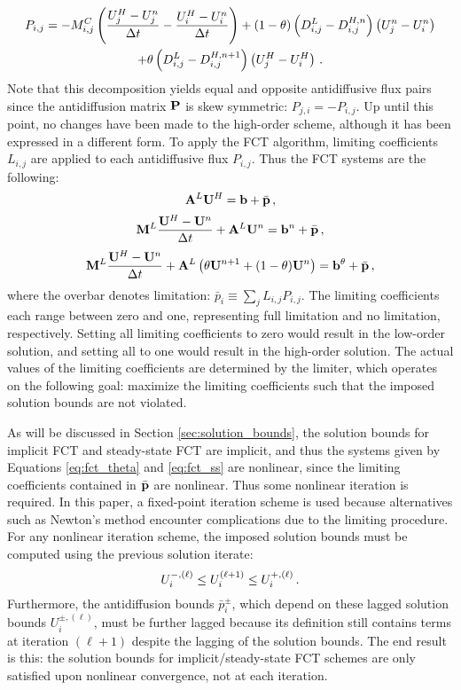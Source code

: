 \begin{multline}
  P_{i,j} = -M^C_{i,j}\pr{\frac{U^H_j - U^n_j}{\dt} - \frac{U^H_i - U^n_i}{\dt}}
    + (1-\theta)\pr{D^L_{i,j} - D^{H,n}_{i,j}}\pr{U^n_j - U^n_i}\\
    + \theta\pr{D^L_{i,j} - D^{H,n+1}_{i,j}}\pr{U^H_j - U^H_i} \eqp
\end{multline}
Note that this decomposition yields equal and opposite antidiffusive flux pairs
since the antidiffusion matrix $\P$ is skew symmetric: $P_{j,i}=-P_{i,j}$.
Up until this point, no changes have been made to the
high-order scheme, although it has been expressed in a different form.
To apply the FCT algorithm, limiting coefficients $L_{i,j}$ are applied to
each antidiffusive flux $P_{i,j}$. Thus the FCT systems are the following:
\begin{equation}\label{eq:fct_ss}
  \A^L \U^H = \ssrhs + \bar{\p} \eqc
\end{equation}
\begin{equation}\label{eq:fct_fe}
  \M^L\frac{\U^H - \U^n}{\dt} + \A^L\U^n = \ssrhs^n + \bar{\p} \eqc
\end{equation}
\begin{equation}\label{eq:fct_theta}
  \M^L\frac{\U^H - \U^n}{\dt} + \A^L\pr{\theta\U^{n+1} + (1-\theta)\U^n}
    = \ssrhs^\theta + \bar{\p} \eqc
\end{equation}
where the overbar denotes limitation: $\bar{p}_i\equiv\sum_j L_{i,j}P_{i,j}$.
The limiting coefficients each range between zero and one, representing
full limitation and no limitation, respectively. Setting all limiting
coefficients to zero would result in the low-order solution, and setting
all to one would result in the high-order solution. The actual values of the
limiting coefficients are determined by the limiter, which operates on the
following goal: maximize the limiting coefficients such that the imposed
solution bounds are not violated.

As will be discussed in Section \ref{sec:solution_bounds}, the solution bounds
for implicit FCT and steady-state FCT are implicit, and thus the systems given
by Equations \eqref{eq:fct_theta} and \eqref{eq:fct_ss} are nonlinear, since
the limiting coefficients contained in $\bar{\p}$ are nonlinear. Thus some
nonlinear iteration is required. In this paper, a fixed-point iteration scheme
is used because alternatives such as Newton's method encounter complications
due to the limiting procedure. For any nonlinear iteration scheme, the
imposed solution bounds must be computed using the previous solution iterate:
\begin{equation}
  U_i^{-,(\ell)} \leq U_i^{(\ell+1)} \leq U_i^{+,(\ell)} \eqp
\end{equation}
Furthermore, the antidiffusion bounds $\bar{p}_i^\pm$, which depend on these
lagged solution bounds $U_i^{\pm,(\ell)}$, must be further lagged because
its definition still contains terms at iteration $(\ell+1)$ despite the lagging
of the solution bounds. The end result is this: the solution bounds for implicit/steady-state
FCT schemes are only satisfied upon nonlinear convergence, not at each iteration.

